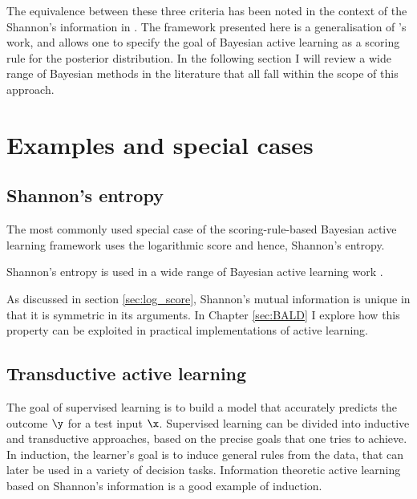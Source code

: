 The equivalence between these three criteria has been noted in the context of the Shannon's information in \citep{MacKay1992}. The framework presented here is a generalisation of \citeauthor{MacKay1992}'s work, and allows one to specify the goal of Bayesian active learning as a scoring rule for the posterior distribution. In the following section I will review a wide range of Bayesian methods in the literature that all fall within the scope of this approach.


\section{Examples and special cases}

\subsection{Shannon's entropy\label{sec:active_learning_shannon_information}}

The most commonly used special case of the scoring-rule-based Bayesian active learning framework uses the logarithmic score and hence, Shannon's entropy. 

Shannon's entropy is used in a wide range of Bayesian active learning work \citep{MacKay1992,Lawrence2004,Krause2006,Ji2008,Settles2010,Houlsby2011,Huszar2012quantum}.

As discussed in section \ref{sec:log_score}, Shannon's mutual information is unique in that it is symmetric in its arguments. In Chapter \ref{sec:BALD} I explore how this property can be exploited in practical implementations of active learning.

\subsection{Transductive active learning}

The goal of supervised learning is to build a model that accurately predicts the outcome $\y$ for a test input $\x$. Supervised learning can be divided into inductive and transductive approaches, based on the precise goals that one tries to achieve. In induction, the learner's goal is to induce general rules from the data, that can later be used in a variety of decision tasks. Information theoretic active learning based on Shannon's information is a good example of induction.

